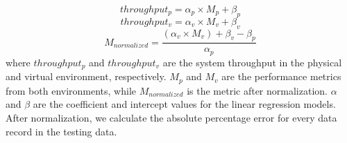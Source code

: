 \begin{equation*}
throughput_{p}= \alpha_{p} \times M_{p} + \beta_{p}
\end{equation*}
\vspace{-0.4cm}
\begin{equation*}
throughput_{v}= \alpha_{v} \times M_{v} + \beta_{v}
\end{equation*}
\vspace{-0.4cm}
\begin{equation*}
M_{normalized} = \frac{(\alpha_{v} \times M_{v})+\beta_{v}-\beta_{p}}{\alpha_{p}}
	\end{equation*}
where $throughput_{p}$ and $throughput_{v}$ are the system throughput in the physical and virtual environment, respectively. $M_{p}$ and $M_{v}$ are the performance metrics from both environments, while $M_{normalized}$ is the metric after normalization. $\alpha$ and $\beta$ are the coefficient and intercept values for the linear regression models. After normalization, we calculate the absolute percentage error for every data record in the testing data.






